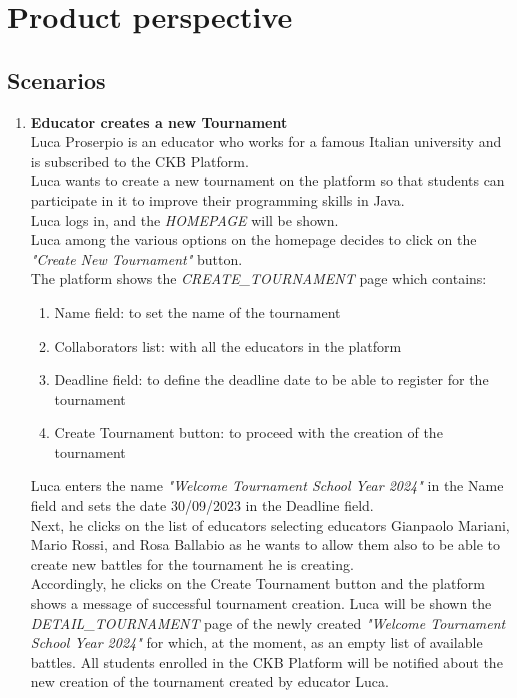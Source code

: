 \section{Product perspective}
\subsection{Scenarios}

\begin{enumerate}
	\item \textbf{Educator creates a new Tournament}\\
	      Luca Proserpio is an educator who works for a famous Italian university and is subscribed to the CKB Platform.\\
	      Luca wants to create a new tournament on the platform so that students can participate in it to improve their programming skills in Java.\\
	      Luca logs in, and the \emph{HOMEPAGE} will be shown.\\
	      Luca among the various options on the homepage decides to click on the \emph{"Create New Tournament"} button. \\
	      The platform shows the \emph{CREATE\_TOURNAMENT} page which contains:

	      \begin{enumerate}
		      \item Name field: to set the name of the tournament
		      \item Collaborators list: with all the educators in the platform
		      \item Deadline field: to define the deadline date to be able to register for the tournament
		      \item Create Tournament button: to proceed with the creation of the tournament
	      \end{enumerate}

	      Luca enters the name \emph{"Welcome Tournament School Year 2024"} in the Name field and sets the date 30/09/2023 in the Deadline field.\\
	      Next, he clicks on the list of educators selecting educators Gianpaolo Mariani, Mario Rossi, and Rosa Ballabio as he wants to allow them also to be able to create new
	      battles for the tournament he is creating.\\
	      Accordingly, he clicks on the Create Tournament button and the platform shows a message of successful tournament creation.
	      Luca will be shown the \emph{DETAIL\_TOURNAMENT} page of the newly created \emph{"Welcome Tournament School Year 2024"} for which, at the moment, as an empty list of
	      available
	      battles.
	      All students enrolled in the CKB Platform will be notified about the new creation of the tournament created by educator Luca.





\end{enumerate}
